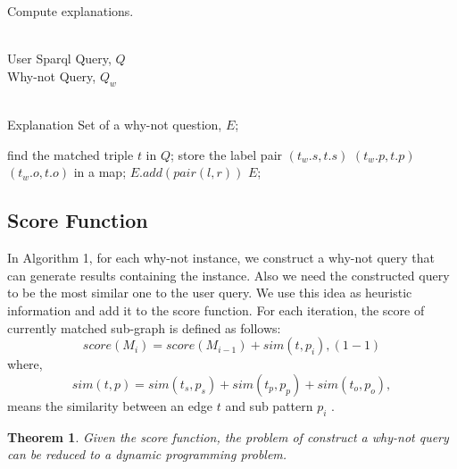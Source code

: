 \documentclass{article}
\begin{document}
\begin{algorithm}[htb]         %
\caption{ Compute explanations.}      %
\label{alg2:Framwork}                  %
\begin{algorithmic}[1]                %

\REQUIRE ~~\\                         %
    User Sparql Query, $Q$\\
    Why-not Query, $Q_w$

\ENSURE ~~\\                          %
    Explanation Set of a why-not question,  $E$;

\STATE find the matched triple $t$ in $Q$;
\STATE store the label pair $(t_w.s, t.s)$ $(t_w.p, t.p)$ $(t_w.o, t.o)$ in a map;
\ENDFOR
{}
\STATE $E.add(pair(l, r))$
\ENDIF
\ENDFOR
\RETURN $E$;                %

\end{algorithmic}
\end{algorithm}






\subsection{Score Function}

In Algorithm 1, for each why-not instance, we construct a why-not query that can generate results containing the instance. Also we need the constructed query to be the most similar one to the user query. We use this idea as heuristic information and add it to the score function. For each iteration, the score of currently matched sub-graph is defined as follows:
$$ score(M_i) = score(M_{i-1}) + sim(t, p_i  ), (1-1)$$
where,
$$ sim(t, p) = sim(t_s, p_s ) + sim(t_p, p_p ) + sim(t_o, p_o ) ,$$
means the similarity between an edge $t$ and sub pattern $p_i$ .

\newtheorem{thm}{Theorem}[section]
\begin{thm}
Given the score function, the problem of construct a why-not query can be reduced to a dynamic programming problem.
\end{thm}
\end{document}

